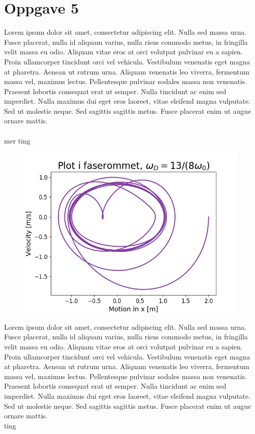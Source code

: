 \documentclass[norsk,a4paper,12pt]{article}
\begin{document}
\section*{Oppgave 5}

Lorem ipsum dolor sit amet, consectetur adipiscing elit. Nulla sed massa urna. Fusce placerat, nulla id aliquam varius, nulla risus commodo metus, in fringilla velit massa eu odio. Aliquam vitae eros at orci volutpat pulvinar eu a sapien. Proin ullamcorper tincidunt orci vel vehicula. Vestibulum venenatis eget magna at pharetra. Aenean ut rutrum urna. Aliquam venenatis leo viverra, fermentum massa vel, maximus lectus. Pellentesque pulvinar sodales massa non venenatis. Praesent lobortis consequat erat ut semper. Nulla tincidunt ac enim sed imperdiet. Nulla maximus dui eget eros laoreet, vitae eleifend magna vulputate. Sed ut molestie neque. Sed sagittis sagittis metus. Fusce placerat enim ut augue ornare mattis.
\\
\\
mer ting
\begin{figure}
\includegraphics[scale=0.8]{Oppgave5del1.png}
\end{figure}


Lorem ipsum dolor sit amet, consectetur adipiscing elit. Nulla sed massa urna. Fusce placerat, nulla id aliquam varius, nulla risus commodo metus, in fringilla velit massa eu odio. Aliquam vitae eros at orci volutpat pulvinar eu a sapien. Proin ullamcorper tincidunt orci vel vehicula. Vestibulum venenatis eget magna at pharetra. Aenean ut rutrum urna. Aliquam venenatis leo viverra, fermentum massa vel, maximus lectus. Pellentesque pulvinar sodales massa non venenatis. Praesent lobortis consequat erat ut semper. Nulla tincidunt ac enim sed imperdiet. Nulla maximus dui eget eros laoreet, vitae eleifend magna vulputate. Sed ut molestie neque. Sed sagittis sagittis metus. Fusce placerat enim ut augue ornare mattis.
\\
ting
\end{document}
